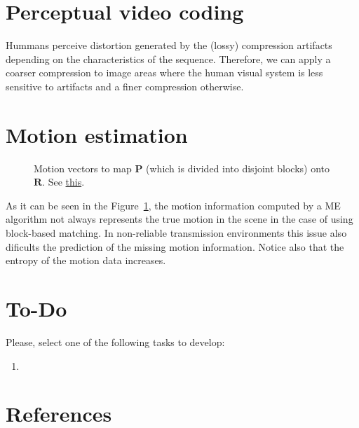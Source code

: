 \section{Perceptual video coding}
Hummans perceive distortion generated by the (lossy) compression
artifacts depending on the characteristics of the sequence. Therefore,
we can apply a coarser compression to image areas where the human
visual system is less sensitive to artifacts and a finer compression
otherwise.

\section{Motion estimation}
\begin{figure}
  \centering
  \caption{Motion vectors to map ${\mathbf P}$ (which is divided into
    disjoint blocks) onto ${\mathbf R}$. See
    \href{https://github.com/Sistemas-Multimedia/Sistemas-Multimedia.github.io/blob/master/milestones/09-ME/full_search_block_ME.ipynb}{this}.}
  \label{fig:MVs_block}
\end{figure}

As it can be seen in the Figure~\ref{fig:MVs_block}, the motion
information computed by a ME algorithm not always represents the true
motion in the scene in the case of using block-based matching. In
non-reliable transmission environments this issue also dificults the
prediction of the missing motion information. Notice also that the
entropy of the motion data increases.

\section{To-Do}
Please, select one of the following tasks to develop:
\begin{enumerate}
\item
\end{enumerate}

\section{References}

\renewcommand{\addcontentsline}[3]{}%

